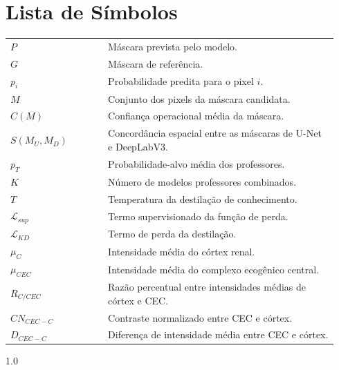 \documentclass[12pt]{article}
\begin{document}
  \section*{Lista de Símbolos}
  \begingroup
    \setlength{\parindent}{0pt}
    \renewcommand{\arraystretch}{1.18}
    \begin{tabular}{@{}p{0.28\linewidth}p{0.66\linewidth}@{}}
      \(P\) & Máscara prevista pelo modelo.\\
      \(G\) & Máscara de referência.\\
      \(p_i\) & Probabilidade predita para o pixel \(i\).\\
      \(M\) & Conjunto dos pixels da máscara candidata.\\
      \(C(M)\) & Confiança operacional média da máscara.\\
      \(S(M_U,M_D)\) & Concordância espacial entre as máscaras de U-Net e DeepLabV3.\\
      \(p_T\) & Probabilidade-alvo média dos professores.\\
      \(K\) & Número de modelos professores combinados.\\
      \(T\) & Temperatura da destilação de conhecimento.\\
      \(\mathcal{L}_{sup}\) & Termo supervisionado da função de perda.\\
      \(\mathcal{L}_{KD}\) & Termo de perda da destilação.\\
      \(\mu_C\) & Intensidade média do córtex renal.\\
      \(\mu_{CEC}\) & Intensidade média do complexo ecogênico central.\\
      \(R_{C/CEC}\) & Razão percentual entre intensidades médias de córtex e CEC.\\
      \(CN_{CEC-C}\) & Contraste normalizado entre CEC e córtex.\\
      \(D_{CEC-C}\) & Diferença de intensidade média entre CEC e córtex.\\
    \end{tabular}
  \endgroup
  \clearpage
  \begingroup
    \setcounter{tocdepth}{2} %
    \setlength{\parskip}{0pt}
    \begin{spacing}{1.0}
      \tableofcontents
    \end{spacing}
  \endgroup
  \clearpage
  \pagestyle{paginaqualificacao}
  \thispagestyle{paginaqualificacao}
\fi
\end{document}
